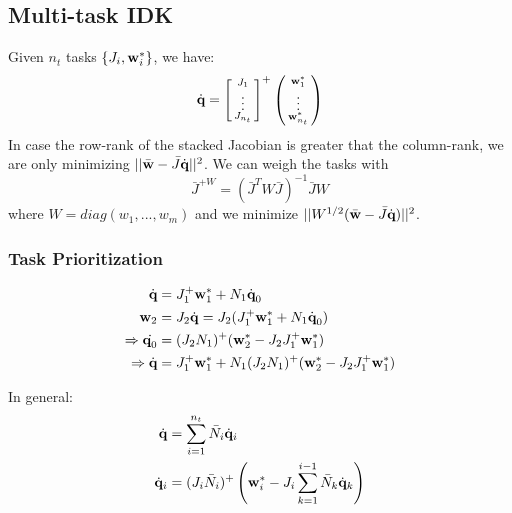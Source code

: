 \documentclass[a4paper, 8pt]{extarticle}
\begin{document}
\begin{multicols*}{3}
\subsection{Multi-task IDK}
Given $n_t$ tasks $\{J_i, \textbf w^*_i\}$, we have:
$$\dot{\textbf q} = \left[\begin{smallmatrix}
J_1\\ \vdots \\ J_{n_t}
\end{smallmatrix}\right]^+  \left(\begin{smallmatrix}
\textbf w_1^* \\ \vdots \\ \textbf w_{n_t}^*
\end{smallmatrix}\right)$$
In case the row-rank of the stacked Jacobian is greater that the column-rank, we are only minimizing $||\bar{\textbf w} - \bar J\dot{\textbf q}||^2$. We can weigh the tasks with
$$\bar J^{+W} = (\bar J^T W \bar J)^{-1}\bar J W$$
where $W = diag(w_1,...,w_m)$ and we minimize $||W^{1/2}(\bar{\textbf w} - \bar J\dot{\textbf q})||^2$.


\subsubsection*{Task Prioritization}
\begin{align*}
\dot{\textbf{q}} &= J_1^+\textbf w_1^* + N_1\dot{\textbf{q}}_0\\
\textbf{w}_2 &= J_2\dot{\mathbf q} = J_2(J_1^+\textbf w_1^* + N_1\dot{\textbf{q}}_0)\\
\Rightarrow \dot{\textbf q_0} &= (J_2N_1)^+(\textbf w_2^* - J_2J_1^+\textbf w_1^*)\\
\Rightarrow \dot{\textbf{q}} &= J_1^+\textbf w_1^* + N_1(J_2N_1)^+(\textbf w_2^* - J_2J_1^+\textbf w_1^*)
\end{align*}

In general:
\begin{align*}
\dot{\mathbf q} &= \sum_{i=1}^{n_t}\bar N_i \dot{\mathbf q}_i \\ 
\dot{\mathbf q}_i &= (J_i \bar N_i)^+ \left( \textbf w_i^* - J_i \sum_{k=1}^{i-1}\bar N_k \dot{\mathbf q}_k \right)
\end{align*}




\end{multicols*}
\end{document}

